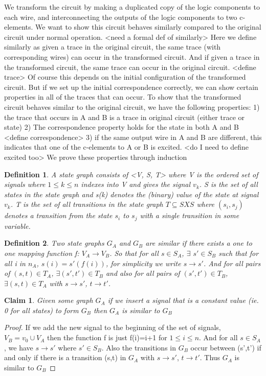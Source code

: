 \documentclass{article}
\newtheorem*{definition}{Definition}
\newtheorem*{claim}{Claim}
\begin{document}
We transform the circuit by making a duplicated copy of the logic components to each wire, and interconnecting the outputs of the logic components to two c-elements.  We want to show this circuit behaves similarly
compared to the original circuit under normal operation.  <need a formal def of similarly> Here we define similarly as given a trace in the original circuit, the same trace (with corresponding wires) can occur in the transformed circuit.  And if given a trace
in the transformed circuit, the same trace can occur in the original circuit. <define trace>  Of course this depends on the initial configuration of the transformed circuit.  But if we set up the initial correspondence correctly, we can show
certain properties in all of the traces that can occur.  
\newline
To show that the transformed circuit behaves similar to the original circuit, we have the following properties:
1)  the trace that occurs in A and B is a trace in original circuit (either trace or state)
2)  The correspondence property holds for the state in both A and B <define correspondence>
3)  if the same output wire in A and B are different, this indicates that one of the c-elements to A or B is excited. <do I need to define excited too>
\newline
We prove these properties through induction


\begin{definition}A state graph consists of <V, S, T> where V is the ordered set of signals where $1\leq k \leq n$ indexes into V and gives the signal $v_k$.  S is the set of all states in the state graph
and s(k) denotes the (binary) value of the state at signal $v_k$.  T is the set of all transitions in the state graph $T \subseteq S X S$ where $(s_i, s_j)$ denotes a transition from the state $s_i$ to $s_j$ 
with a single transition in some variable.\end{definition}
\begin{definition}Two state graphs $G_A$ and $G_B$ are similar if there exists a one to one mapping function f: $V_A \to V_B$.  So that for all $s \in S_A$, $\exists$ $s' \in S_B$ such that for all i in $n_A$,
$s(i)=s'(f(i))$, for simplicity we write $s\to s'$. And for all pairs of $(s,t) \in T_A$, $\exists (s',t') \in T_B$ and also for all pairs of $(s',t') \in T_B$, $\exists (s,t) \in T_A$ with $s\to s'$, $t\to t'$.\end{definition}

\begin{claim}Given some graph $G_A$ if we insert a signal that is a constant value (ie. 0 for all states) to form $G_B$ then $G_A$ is similar to $G_B$  \end{claim}
\begin{proof}
If we add the new signal to the beginning of the set of signals, $V_B={v_0} \cup V_A$ then the function f is just f(i)=i+1 for $1\leq i \leq n$.  And for all $s \in S_A$, we have $s\to s'$ where $s' \in S_B$.
Also the transitions in $G_B$ occur between (s',t') if and only if there is a transition (s,t) in $G_A$ with $s\to s'$, $t\to t'$.  Thus $G_A$ is similar to $G_B$
\end{proof}
\end{document}
